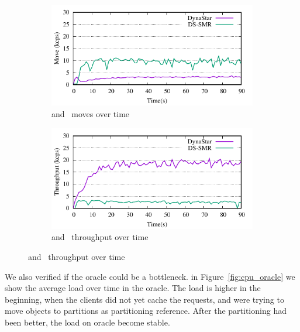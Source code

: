 \begin{figure}
\centering
\begin{subfigure}[ht]{0.5\textwidth}
\captionsetup{justification=centering}
	\includegraphics{figures/experiments/move-dynastar-vs-dssmr-4p}
	\caption{\dynastar and \dssmr\ moves over time}
	\label{fig:4p_moves}
\end{subfigure}

\begin{subfigure}[ht]{0.5\textwidth}
	\includegraphics{figures/experiments/tp-dynastar-vs-dssmr-4p}
	\caption{\dynastar and \dssmr\ throughput over time}
	\label{fig:4p_tput}
\end{subfigure}
\label{fig:move_throughput_ddsm_vs_dynastar}
\end{figure}


We also verified if the oracle could be a bottleneck. in Figure~\ref{fig:cpu_oracle} we show the average load over time in the oracle.
The load is higher in the beginning, when the clients did not yet cache the requests, and \dynastar were trying to move objects to partitions as partitioning reference. After the partitioning had been better, the load on oracle become stable.

